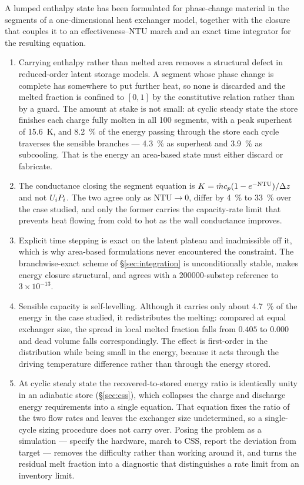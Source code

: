 A lumped enthalpy state has been formulated for phase-change material in the
segments of a one-dimensional heat exchanger model, together with the closure
that couples it to an effectiveness--NTU march and an exact time integrator for
the resulting equation.

\begin{enumerate}[leftmargin=1.8em,itemsep=3pt]
\item Carrying enthalpy rather than melted area removes a structural defect in
  reduced-order latent storage models. A segment whose phase change is complete
  has somewhere to put further heat, so none is discarded and the melted
  fraction is confined to $[0,1]$ by the constitutive relation rather than by a
  guard. The amount at stake is not small: at cyclic steady state the store
  finishes each charge fully molten in all \num{100} segments, with a peak
  superheat of \SI{15.6}{\kelvin}, and \SI{8.2}{\percent} of the energy
  passing through the store each cycle traverses the sensible branches ---
  \SI{4.3}{\percent} as superheat and \SI{3.9}{\percent} as subcooling. That is
  the energy an area-based state must either discard or fabricate.
\item The conductance closing the segment equation is
  $K=\dot m c_{p}(1-e^{-\mathrm{NTU}})/\Delta z$ and not $U_{i} P_{i}$. The two agree
  only as $\mathrm{NTU}\to0$, differ by \SI{4}{\percent} to \SI{33}{\percent}
  over the case studied, and only the former carries the capacity-rate limit
  that prevents heat flowing from cold to hot as the wall conductance improves.
\item Explicit time stepping is exact on the latent plateau and inadmissible off
  it, which is why area-based formulations never encountered the constraint. The
  branchwise-exact scheme of \S\ref{sec:integration} is unconditionally stable,
  makes energy closure structural, and agrees with a \num{200000}-substep
  reference to $3\times10^{-13}$.
\item Sensible capacity is self-levelling. Although it carries only about
  \SI{4.7}{\percent} of the energy in the case studied, it redistributes the
  melting: compared at equal exchanger size, the spread in local melted fraction
  falls from $0.405$ to $0.000$ and dead volume falls correspondingly. The
  effect is first-order in the distribution while being small in the energy,
  because it acts through the driving temperature difference rather than through
  the energy stored.
\item At cyclic steady state the recovered-to-stored energy ratio is identically
  unity in an adiabatic store (\S\ref{sec:css}), which collapses the charge and
  discharge energy requirements into a single equation. That equation fixes the
  ratio of the two flow rates and leaves the exchanger size undetermined, so a
  single-cycle sizing procedure does not carry over. Posing the problem as a
  simulation --- specify the hardware, march to CSS, report the deviation from
  target --- removes the difficulty rather than working around it, and turns the
  residual melt fraction into a diagnostic that distinguishes a rate limit from
  an inventory limit.
\end{enumerate}

